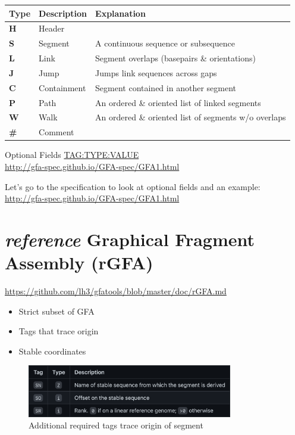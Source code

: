 \documentclass[
]{book}
\providecommand{\tightlist}{%
  \setlength{\itemsep}{0pt}\setlength{\parskip}{0pt}}
\begin{document}
\begin{longtable}[]{@{}lll@{}}
\toprule()
Type & Description & Explanation \\
\midrule()
\endhead
\textbf{H} & Header & \\
\textbf{S} & Segment & A continuous sequence or subsequence \\
\textbf{L} & Link & Segment overlaps (basepairs \& orientations) \\
\textbf{J} & Jump & Jumps link sequences across gaps \\
\textbf{C} & Containment & Segment contained in another segment \\
\textbf{P} & Path & An ordered \& oriented list of linked segments \\
\textbf{W} & Walk & An ordered \& oriented list of segments w/o overlaps \\
\textbf{\#} & Comment & \\
\bottomrule()
\end{longtable}

Optional Fields \url{TAG:TYPE:VALUE}\\
\url{http://gfa-spec.github.io/GFA-spec/GFA1.html}

Let's go to the specification to look at optional fields and an example:\\
\url{http://gfa-spec.github.io/GFA-spec/GFA1.html}

\hypertarget{reference-graphical-fragment-assembly-rgfa}{%
\section{\texorpdfstring{\emph{reference} Graphical Fragment Assembly (rGFA)}{reference Graphical Fragment Assembly (rGFA)}}\label{reference-graphical-fragment-assembly-rgfa}}

\url{https://github.com/lh3/gfatools/blob/master/doc/rGFA.md}

\begin{itemize}
\tightlist
\item
  Strict subset of GFA
\item
  Tags that trace origin
\item
  Stable coordinates
\end{itemize}

\begin{figure}
\centering
\includegraphics[width=0.8\textwidth,height=\textheight]{./Figures/rGFA1.png}
\caption{Additional required tags trace origin of segment}
\end{figure}
\end{document}
